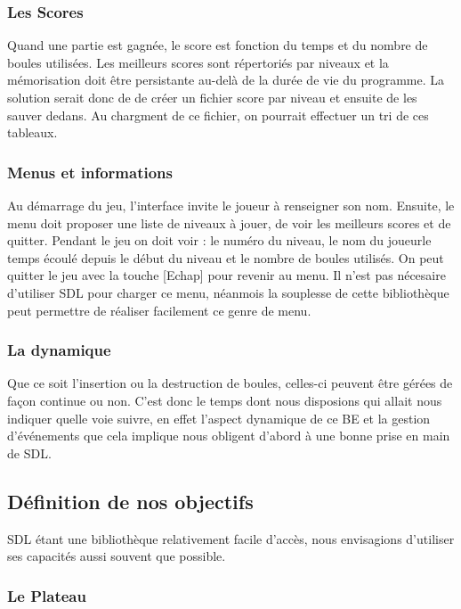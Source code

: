 \subsubsection{Les Scores}

Quand une partie est gagnée, le score est fonction du temps et du nombre de boules utilisées. Les meilleurs scores sont répertoriés par niveaux et la mémorisation doit être persistante au-delà de la durée de vie du programme. La solution serait donc de de créer un fichier score par niveau et ensuite de les sauver dedans. Au chargment de ce fichier, on pourrait effectuer un tri de ces tableaux.

\subsubsection{Menus et informations}

Au démarrage du jeu, l'interface invite le joueur à renseigner son nom.
Ensuite, le menu doit proposer une liste de niveaux à jouer, de voir les meilleurs scores et de quitter.
Pendant le jeu on doit voir : le numéro du niveau, le nom du joueurle temps écoulé depuis le début du niveau et le nombre de boules utilisés.
On peut quitter le jeu avec la touche [Echap] pour revenir au menu.
Il n'est pas nécesaire d'utiliser SDL pour charger ce menu, néanmois la souplesse de cette bibliothèque peut permettre de réaliser facilement ce genre de menu.

\subsubsection{La dynamique}

Que ce soit l'insertion ou la destruction de boules, celles-ci peuvent être gérées de façon continue ou non. C'est donc le temps dont nous disposions qui allait nous indiquer quelle voie suivre, en effet l'aspect dynamique de ce BE et la gestion d'événements que cela implique
nous obligent d'abord à une bonne prise en main de SDL. 


\subsection{Définition de nos objectifs} 
SDL étant une bibliothèque relativement facile d'accès, nous envisagions d'utiliser ses capacités aussi souvent que possible.

\subsubsection{Le Plateau}

